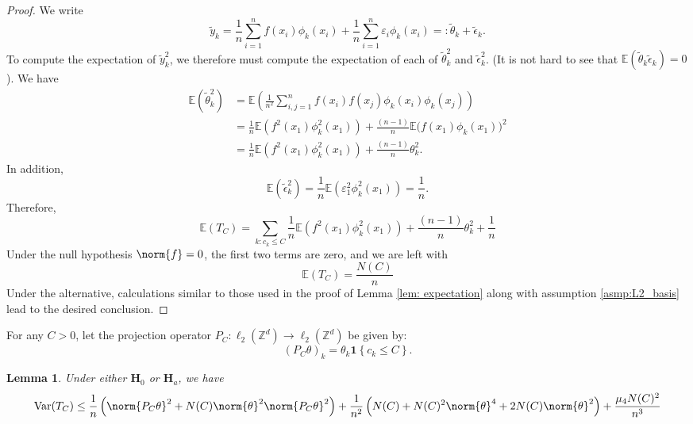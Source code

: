 \documentclass{article}
\newcommand{\set}[1]{\left\{#1\right\}}
\newcommand{\Var}{\mathrm{Var}}
\newcommand{\1}{\mathbb{I}}
\newcommand{\Ebb}{\mathbb{E}}
\theoremstyle{alden}
\theoremstyle{aldenthm}
\newtheorem{lemma}{Lemma}
\theoremstyle{definition}
\theoremstyle{remark}
\begin{document}
\begin{proof}
	We write
	\begin{equation*}
	\widetilde{y}_k = \frac{1}{n} \sum_{i = 1}^{n} f(x_i) \phi_k(x_i) + \frac{1}{n} \sum_{i = 1}^{n} \varepsilon_i \phi_k(x_i) =: \widetilde{\theta}_k + \widetilde{\epsilon}_k.
	\end{equation*}
	To compute the expectation of $\widetilde{y}_k^2$, we therefore must compute the expectation of each of $\widetilde{\theta}_k^2$ and $\widetilde{\epsilon}_k^2$. (It is not hard to see that $\Ebb(\widetilde{\theta}_k \widetilde{\epsilon}_k) = 0$). We have
	\begin{align*}
	\Ebb(\widetilde{\theta}_k^2) & = \Ebb \left(\frac{1}{n^2} \sum_{i,j = 1}^{n} f(x_i) f(x_j) \phi_k(x_i) \phi_k(x_j)\right) \\
	& = \frac{1}{n} \Ebb(f^2(x_1) \phi_k^2(x_1)) + \frac{(n-1)}{n} \Ebb\bigl(f(x_1)\phi_k(x_1)\bigr)^2 \\
	& = \frac{1}{n} \Ebb(f^2(x_1) \phi_k^2(x_1)) + \frac{(n-1)}{n} \theta_k^2.
	\end{align*}
	In addition,
	\begin{equation*}
	\Ebb(\widetilde{\epsilon}_k^2) = \frac{1}{n} \Ebb(\varepsilon_1^2 \phi_k^2(x_1)) = \frac{1}{n}. 
	\end{equation*}
	Therefore,
	\begin{equation*}
	\Ebb(T_C) = \sum_{k: c_k \leq C} \frac{1}{n} \Ebb(f^2(x_1) \phi_k^2(x_1)) + \frac{(n-1)}{n} \theta_k^2 + \frac{1}{n}
	\end{equation*}
	Under the null hypothesis $\norm{f} = 0$, the first two terms are zero, and we are left with
	\begin{equation*}
	\Ebb(T_C) = \frac{N(C)}{n}
	\end{equation*}
	Under the alternative, calculations similar to those used in the proof of Lemma \ref{lem: expectation} along with assumption \ref{asmp:L2_basis} lead to the desired conclusion.
\end{proof}
For any $C > 0$, let the projection operator $P_C: \ell_2(\mathbb{Z}^d) \to \ell_2(\mathbb{Z}^d)$ be given by:
\begin{equation*}
(P_C \theta)_k = \theta_k \mathbf{1}\set{c_k \leq C}.
\end{equation*}
\begin{lemma}
	\label{lem:regression}
	Under either $\mathbf{H}_0$ or $\mathbf{H}_a$, we have
	\begin{equation}
	\label{eqn:variance_regression}
	\Var(T_C) \leq \frac{1}{n} \left(\norm{P_C\theta}^2 + N(C) \norm{\theta}^2 \norm{P_C\theta}^2\right) + \frac{1}{n^2}\left(N(C) + N(C)^2 \norm{\theta}^4 + 2N(C)\norm{\theta}^2\right) + \frac{\mu_4 N(C)^2}{n^3}
	\end{equation}
\end{lemma}
\end{document}

